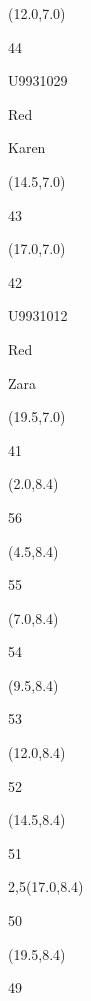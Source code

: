 \documentclass[a4paper]{article}
\newcommand{\myseat}[4]{%
\vspace{-0.1cm} \hspace{-0.5cm}
\parbox[t][2.2cm][t]{3.5cm}{%
\small #1 %
\begin{description}
\vspace{-0.1cm}
\item [ID:] #2
\vspace{-0.1cm}
\item [Team:] #3 \normalsize
\vspace{-0.1cm}
\item \normalsize #4
\vspace{-0.1cm}
\end{description}
}
}
\begin{document}
\begin{textblock}{2.5}(12.0,7.0)
\myseat{44}{U9931029}{Red}{Karen}
\end{textblock}

\begin{textblock}{2.5}(14.5,7.0)
\textblockcolor{}
\myseat{43}{}{}{}
\end{textblock}

\begin{textblock}{2.5}(17.0,7.0)
\myseat{42}{U9931012}{Red}{Zara}
\end{textblock}

\begin{textblock}{2.5}(19.5,7.0)
\textblockcolor{}
\myseat{41}{}{}{}
\end{textblock}


\begin{textblock}{2.5}(2.0,8.4)
\textblockcolor{}
\myseat{56}{}{}{}
\end{textblock}

\begin{textblock}{2.5}(4.5,8.4)
\textblockcolor{}
\myseat{55}{}{}{}
\end{textblock}

\begin{textblock}{2.5}(7.0,8.4)
\textblockcolor{}
\myseat{54}{}{}{}
\end{textblock}

\begin{textblock}{2.5}(9.5,8.4)
\textblockcolor{}
\myseat{53}{}{}{}
\end{textblock}

\begin{textblock}{2.5}(12.0,8.4)
\textblockcolor{}
\myseat{52}{}{}{}
\end{textblock}

\begin{textblock}{2.5}(14.5,8.4)
\textblockcolor{}
\myseat{51}{}{}{}
\end{textblock}

\begin{textblock}{2,5}(17.0,8.4)
\textblockcolor{}
\myseat{50}{}{}{}
\end{textblock}

\begin{textblock}{2.5}(19.5,8.4)
\textblockcolor{}
\myseat{49}{}{}{}
\end{textblock}
\end{document}
